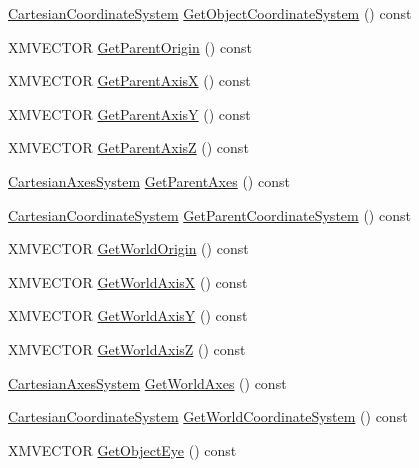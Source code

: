 \begin{DoxyCompactItemize}
\item 
\hyperlink{structmage_1_1_cartesian_coordinate_system}{Cartesian\+Coordinate\+System} \hyperlink{structmage_1_1_transform_a6c14d929c23c6b6e065e7f9b0ed919ea}{Get\+Object\+Coordinate\+System} () const
\item 
X\+M\+V\+E\+C\+T\+OR \hyperlink{structmage_1_1_transform_a4c33d968669e0342bdff3582825549ae}{Get\+Parent\+Origin} () const
\item 
X\+M\+V\+E\+C\+T\+OR \hyperlink{structmage_1_1_transform_afd81bb8bef70bebc59df3ff157d53bc9}{Get\+Parent\+AxisX} () const
\item 
X\+M\+V\+E\+C\+T\+OR \hyperlink{structmage_1_1_transform_a973c17d7d77c742f0b6d8fbdf5041128}{Get\+Parent\+AxisY} () const
\item 
X\+M\+V\+E\+C\+T\+OR \hyperlink{structmage_1_1_transform_a6b8002971da0bd9acbbd865c7325c860}{Get\+Parent\+AxisZ} () const
\item 
\hyperlink{structmage_1_1_cartesian_axes_system}{Cartesian\+Axes\+System} \hyperlink{structmage_1_1_transform_acdd8950649ae1a779c254da82136033a}{Get\+Parent\+Axes} () const
\item 
\hyperlink{structmage_1_1_cartesian_coordinate_system}{Cartesian\+Coordinate\+System} \hyperlink{structmage_1_1_transform_a3d6f03cda826eaf99a2d39e5c900fcbe}{Get\+Parent\+Coordinate\+System} () const
\item 
X\+M\+V\+E\+C\+T\+OR \hyperlink{structmage_1_1_transform_aad81c0c7af0f29bb3ead6c8112de262c}{Get\+World\+Origin} () const
\item 
X\+M\+V\+E\+C\+T\+OR \hyperlink{structmage_1_1_transform_ac7a718127c5212bb73d04302371473d0}{Get\+World\+AxisX} () const
\item 
X\+M\+V\+E\+C\+T\+OR \hyperlink{structmage_1_1_transform_a9c4452fa4aefb48e4e6c9a4a38fac32c}{Get\+World\+AxisY} () const
\item 
X\+M\+V\+E\+C\+T\+OR \hyperlink{structmage_1_1_transform_a580b65d46b4af8086fab60d0737fd353}{Get\+World\+AxisZ} () const
\item 
\hyperlink{structmage_1_1_cartesian_axes_system}{Cartesian\+Axes\+System} \hyperlink{structmage_1_1_transform_a580a4f9fd987259da0cf0355ade7fb4b}{Get\+World\+Axes} () const
\item 
\hyperlink{structmage_1_1_cartesian_coordinate_system}{Cartesian\+Coordinate\+System} \hyperlink{structmage_1_1_transform_a809600adbb284334d444ae8c50b17a1d}{Get\+World\+Coordinate\+System} () const
\item 
X\+M\+V\+E\+C\+T\+OR \hyperlink{structmage_1_1_transform_ac6808d885014b98c6920f8a770d3c7d4}{Get\+Object\+Eye} () const

\end{DoxyCompactItemize}
